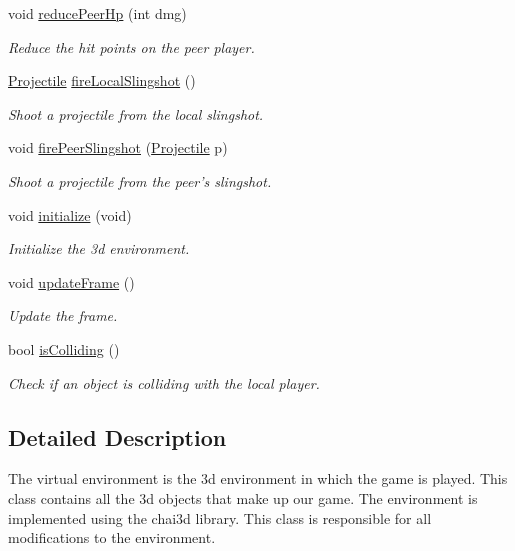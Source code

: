 \begin{DoxyCompactItemize}
void \hyperlink{classVirtualEnvironment_a6e2c1d962098ed2b16b11aac8fe79380}{reducePeerHp} (int dmg)
\begin{DoxyCompactList}\small\item\em Reduce the hit points on the peer player. \item\end{DoxyCompactList}\item 
\hyperlink{classProjectile}{Projectile} \hyperlink{classVirtualEnvironment_a05831f68bb623ab852a52180b92b6efb}{fireLocalSlingshot} ()
\begin{DoxyCompactList}\small\item\em Shoot a projectile from the local slingshot. \item\end{DoxyCompactList}\item 
void \hyperlink{classVirtualEnvironment_a3eb4771f3cd9cba993c9cdc0b8d0271f}{firePeerSlingshot} (\hyperlink{classProjectile}{Projectile} p)
\begin{DoxyCompactList}\small\item\em Shoot a projectile from the peer's slingshot. \item\end{DoxyCompactList}\item 
void \hyperlink{classVirtualEnvironment_a8490579021c2abeef1dba404bab86db9}{initialize} (void)
\begin{DoxyCompactList}\small\item\em Initialize the 3d environment. \item\end{DoxyCompactList}\item 
void \hyperlink{classVirtualEnvironment_adff43d5572e61995b167ea0bc532d1c4}{updateFrame} ()
\begin{DoxyCompactList}\small\item\em Update the frame. \item\end{DoxyCompactList}\item 
bool \hyperlink{classVirtualEnvironment_aacb8b90cc65753c95c2c4a6a9bc9f51b}{isColliding} ()
\begin{DoxyCompactList}\small\item\em Check if an object is colliding with the local player. \item\end{DoxyCompactList}\end{DoxyCompactItemize}


\subsection{Detailed Description}
The virtual environment is the 3d environment in which the game is played. This class contains all the 3d objects that make up our game. The environment is implemented using the chai3d library. This class is responsible for all modifications to the environment. 

